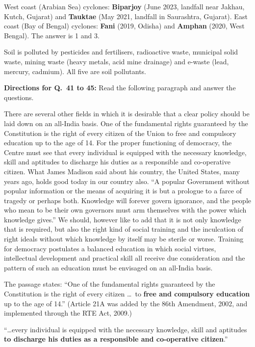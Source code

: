 West coast (Arabian Sea) cyclones: \textbf{Biparjoy} (June 2023, landfall near Jakhau, Kutch, Gujarat) and \textbf{Tauktae} (May 2021, landfall in Saurashtra, Gujarat).
East coast (Bay of Bengal) cyclones: \textbf{Fani} (2019, Odisha) and \textbf{Amphan} (2020, West Bengal).
The answer is 1 and 3.

Soil is polluted by pesticides and fertilisers, radioactive waste, municipal solid waste, mining waste (heavy metals, acid mine drainage) and e-waste (lead, mercury, cadmium). All five are soil pollutants.

\textbf{Directions for Q.~41 to 45:} Read the following paragraph and answer the questions.\par\smallskip
There are several other fields in which it is desirable that a clear policy should be laid down on an all-India basis. One of the fundamental rights guaranteed by the Constitution is the right of every citizen of the Union to free and compulsory education up to the age of 14. For the proper functioning of democracy, the Centre must see that every individual is equipped with the necessary knowledge, skill and aptitudes to discharge his duties as a responsible and co-operative citizen. What James Madison said about his country, the United States, many years ago, holds good today in our country also. ``A popular Government without popular information or the means of acquiring it is but a prologue to a farce of tragedy or perhaps both. Knowledge will forever govern ignorance, and the people who mean to be their own governors must arm themselves with the power which knowledge gives.'' We should, however like to add that it is not only knowledge that is required, but also the right kind of social training and the inculcation of right ideals without which knowledge by itself may be sterile or worse. Training for democracy postulates a balanced education in which social virtues, intellectual development and practical skill all receive due consideration and the pattern of such an education must be envisaged on an all-India basis.

The passage states: ``One of the fundamental rights guaranteed by the Constitution is the right of every citizen \ldots\ to \textbf{free and compulsory education} up to the age of 14.'' (Article 21A was added by the 86th Amendment, 2002, and implemented through the RTE Act, 2009.)

``\ldots every individual is equipped with the necessary knowledge, skill and aptitudes \textbf{to discharge his duties as a responsible and co-operative citizen}.''


